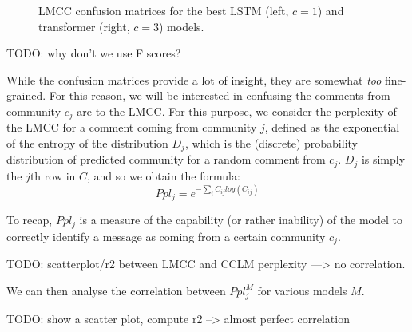 \documentclass[11pt,a4paper]{article}
\begin{document}
\begin{figure*}
\caption{LMCC confusion matrices for the best LSTM (left, $c=1$) and transformer (right, $c=3$) models.}
\label{fig:confusion}
\end{figure*}


TODO: why don't we use F scores?

While the confusion matrices provide a lot of insight, they are
somewhat \emph{too} fine-grained. For this reason, we will be
interested in confusing the comments from community $c_j$ are to the
LMCC. For this purpose, we consider the perplexity of the LMCC for a
comment coming from community $j$, defined as the exponential of the
entropy of the distribution \(D_j\), which is the (discrete)
probability distribution of predicted community for a random comment from
$c_j$. $D_j$ is simply the $j$th row in \(C\), and so we obtain the formula:
\[Ppl_j = e^{-\sum_i C_{ij} log(C_{ij})}\]

To recap, \(Ppl_j\) is a measure of the capability (or rather
inability) of the model to correctly identify a message as coming from
a certain community $c_j$. 


TODO: scatterplot/r2 between LMCC and CCLM perplexity  ---> no correlation.


We can then analyse the correlation between \(Ppl^M_j\) for various models $M$.

TODO: show a scatter plot, compute r2 --> almost perfect correlation



\end{document}
